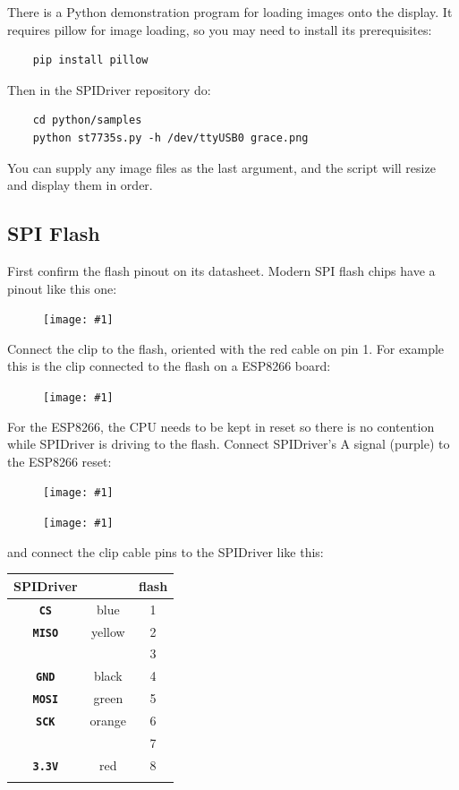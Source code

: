 \documentclass{article}
\newcommand{\png}[1]{
\begin{figure}[H]
\begin{center}
\texttt{[image: \#1]}
\end{center}
\end{figure}
}
\newcommand{\mach}[1]{\texttt{\textbf{#1}}}
\newcommand{\gap}{\vspace{10pt}}
\begin{document}
There is a Python demonstration program for loading images onto the display.
It requires pillow for image loading, so you may need to install its prerequisites:

\begin{lstlisting}
    pip install pillow
\end{lstlisting}

Then in the SPIDriver repository do:

\begin{lstlisting}
    cd python/samples
    python st7735s.py -h /dev/ttyUSB0 grace.png
\end{lstlisting}

You can supply any image files as the last argument,
and the script will resize and display them in order.

\subsection{SPI Flash}

First confirm the flash pinout on its datasheet. Modern SPI flash chips have a pinout like this one:

\png{img/spidriver/spidriver-flash-0}

Connect the clip to the flash, oriented with the red cable on pin 1.
For example this is the clip connected to the flash on a ESP8266 board:

\png{img/spidriver/spidriver-esp1}
 
For the ESP8266, the CPU needs to be kept in reset so there is no contention while SPIDriver is driving to the flash.
Connect SPIDriver's A signal (purple) to the ESP8266 reset:
 
\png{img/spidriver/spidriver-esp2}

\png{img/spidriver/spidriver-flash-2}

and connect the clip cable pins to the SPIDriver like this:

\begin{center}
\gap\begin{tabular}{ccc}
\hline
SPIDriver&        & flash   \\
\hline
\mach{CS}         & blue   & 1 \\
\mach{MISO}       & yellow & 2 \\
                  &        & 3 \\
\mach{GND}        & black  & 4 \\
\mach{MOSI}       & green  & 5 \\
\mach{SCK}        & orange & 6 \\
                  &        & 7 \\
\mach{3.3V}       & red    & 8 \\
\hline \\
\end{tabular}
\end{center}
\end{document}

